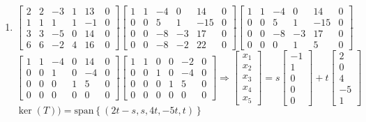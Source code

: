 \documentclass[12pt]{article}
\begin{document}
\begin{enumerate}
\begin{enumerate}
      \item  $\left[ \begin{array}{ccccc|c} 2 & 2 & -3 & 1 & 13 & 0\\ 1 & 1 & 1 & 1 & -1 & 0\\ 3 & 3 & -5 & 0 & 14 & 0\\ 6 & 6 & -2 & 4 & 16 & 0  \end{array}\right]\widetilde{ }\left[ \begin{array}{ccccc|c} 1 & 1 & -4 & 0 & 14 & 0\\ 0 & 0 & 5 & 1 & -15 & 0\\ 0 & 0 & -8 & -3 & 17 & 0\\ 0 & 0 & -8 & -2 & 22 & 0 \end{array}\right]\widetilde{ }\left[ \begin{array}{ccccc|c} 1 & 1 & -4 & 0 & 14 & 0\\ 0 & 0 & 5 & 1 & -15 & 0\\ 0 & 0 & -8 & -3 & 17 & 0\\ 0 & 0 & 0 & 1 & 5 & 0  \end{array}\right]\widetilde{ }$\\$\left[ \begin{array}{ccccc|c} 1 & 1 & -4 & 0 & 14 & 0\\ 0 & 0 & 1 & 0 & -4 & 0\\ 0 & 0 & 0 & 1 & 5 & 0\\ 0 & 0 & 0 & 0 & 0 & 0  \end{array}\right]\widetilde{ }\left[ \begin{array}{ccccc|c} 1 & 1 & 0 & 0 & -2 & 0\\ 0 & 0 & 1 & 0 & -4 & 0\\ 0 & 0 & 0 & 1 & 5 & 0\\ 0 & 0 & 0 & 0 & 0 & 0  \end{array}\right]\Rightarrow\begin{bmatrix} x_1\\x_2\\x_3\\x_4\\x_5\end{bmatrix}=s\begin{bmatrix} -1\\ 1\\0\\0\\0\end{bmatrix} + t\begin{bmatrix} 2\\ 0\\4\\-5\\1\end{bmatrix}$\\$\ker(T))=\text{span}\left\{ (2t-s,s,4t,-5t,t) \right\}$


\end{enumerate}
\end{enumerate}
\end{document}
